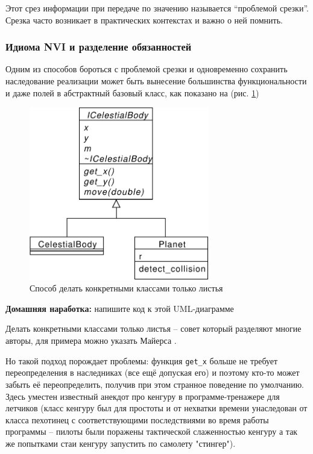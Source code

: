 \documentclass[a4paper,12pt,oneside]{article}
\begin{document}
Этот срез информации при передаче по значению называется ``проблемой срезки''. Срезка часто возникает в практических контекстах и важно о ней помнить.

\subsubsection{Идиома NVI и разделение обязанностей}\label{NVI}

Одним из способов бороться с проблемой срезки и одновременно сохранить наследование реализации может быть вынесение большинства функциональности и даже полей в абстрактный базовый класс, как показано на (рис. \ref{fig:better-implinhh})

\begin{figure}[h!]
\centering
\includegraphics[width=0.7\textwidth]{illustrations/better-implinh-crop.pdf}
\caption{Способ делать конкретными классами только листья}
\label{fig:better-implinhh}
\end{figure}

\textbf{Домашняя наработка:} напишите код к этой UML-диаграмме

Делать конкретными классами только листья -- совет который разделяют многие авторы, для примера можно указать Майерса \cite{effcpp3d}.

Но такой подход порождает проблемы: функция \lstinline!get_x! больше не требует переопределения в наследниках (все ещё допуская его) и поэтому кто-то может забыть её переопределить, получив при этом странное поведение по умолчанию. Здесь уместен известный анекдот про кенгуру в программе-тренажере для летчиков (класс кенгуру был для простоты и от нехватки времени унаследован от класса пехотинец с соответствующими последствиями во время работы программы -- пилоты были поражены тактической слаженностью кенгуру а так же попытками стаи кенгуру запустить по самолету "стингер").
\end{document}
